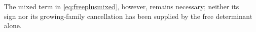 The mixed term in \eqref{eq:freeplusmixed}, however, remains necessary; neither its sign nor its growing-family cancellation has been supplied by the free determinant alone.